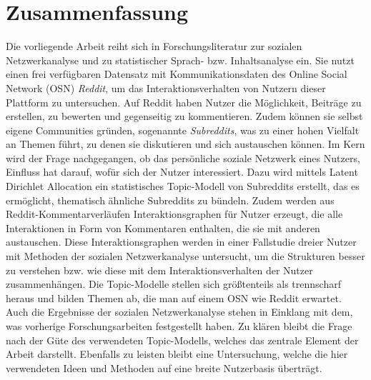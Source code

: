 \section*{Zusammenfassung}

Die vorliegende Arbeit reiht sich in Forschungsliteratur zur sozialen Netzwerkanalyse und zu statistischer Sprach- bzw. Inhaltsanalyse ein.
Sie nutzt einen frei verfügbaren Datensatz mit Kommunikationsdaten des Online Social Network (OSN) \emph{Reddit}, um das Interaktionsverhalten von Nutzern dieser Plattform zu untersuchen.
Auf Reddit haben Nutzer die Möglichkeit, Beiträge zu erstellen, zu bewerten und gegenseitig zu kommentieren.
Zudem können sie selbst eigene Communities gründen, sogenannte \emph{Subreddits}, was zu einer hohen Vielfalt an Themen führt, zu denen sie diskutieren und sich austauschen können.
Im Kern wird der Frage nachgegangen, ob das persönliche soziale Netzwerk eines Nutzers, Einfluss hat darauf, wofür sich der Nutzer interessiert.  
Dazu wird mittels Latent Dirichlet Allocation ein statistisches Topic-Modell von Subreddits erstellt, das es ermöglicht, thematisch ähnliche Subreddits zu bündeln.
Zudem werden aus Reddit-Kommentarverläufen Interaktionsgraphen für Nutzer erzeugt, die alle Interaktionen in Form von Kommentaren enthalten, die sie mit anderen austauschen.
Diese Interaktionsgraphen werden in einer Fallstudie dreier Nutzer mit Methoden der sozialen Netzwerkanalyse untersucht, um die Strukturen besser zu verstehen bzw. wie diese mit dem Interaktionsverhalten der Nutzer zusammenhängen.
Die Topic-Modelle stellen sich größtenteils als trennscharf heraus und bilden Themen ab, die man auf einem OSN wie Reddit erwartet.
Auch die Ergebnisse der sozialen Netzwerkanalyse stehen in Einklang mit dem, was vorherige Forschungsarbeiten festgestellt haben.
Zu klären bleibt die Frage nach der Güte des verwendeten Topic-Modells, welches das zentrale Element der Arbeit darstellt.
Ebenfalls zu leisten bleibt eine Untersuchung, welche die hier verwendeten Ideen und Methoden auf eine breite Nutzerbasis überträgt.